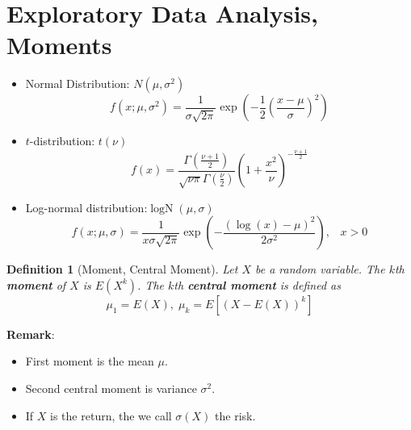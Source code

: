 \documentclass[11pt]{article}
\newtheorem{definition}{Definition}[section]
\theoremstyle{definition}
\DeclareMathOperator{\LogN}{logN}
\begin{document}
\section{Exploratory Data Analysis, Moments}
\begin{itemize}
  \item Normal Distribution: $N(\mu, \sigma^2)$
  \[
f(x;\mu,\sigma^2) = \frac{1}{\sigma\sqrt{2\pi}}\exp(-\frac{1}{2}(\frac{x-\mu}{\sigma})^2)
  \]
  \item $t$-distribution: $t(\nu)$
  \[
f(x)=\frac{\Gamma(\frac{\nu + 1}{2})}{\sqrt{\nu\pi}\Gamma(\frac{\nu}{2})}(1+\frac{x^2}{\nu})^{-\frac{\nu+1}{2}}
  \]
  \item Log-normal distribution:$\LogN(\mu,\sigma)$
  \[
f(x;\mu,\sigma) =\frac{1}{x\sigma\sqrt{2\pi}}\exp(-\frac{(\log(x)-\mu)^2}{2\sigma^2}),\;\;\;x>0
  \]
\end{itemize}
\begin{definition}[Moment, Central Moment]
\normalfont
Let $X$ be a random variable. The $k$th \textbf{moment} of $X$ is $E(X^k)$. The $k$th \textbf{central moment} is defined as
\[
\mu_1=E(X), \;\mu_k=E[(X-E(X))^k]
\]
\end{definition}
\textbf{Remark}:
\begin{itemize}
\item First moment is the mean $\mu$.
\item Second central moment is variance $\sigma^2$.
\item If $X$ is the return, the we call $\sigma(X)$ the risk.
\end{itemize}
\end{document}
